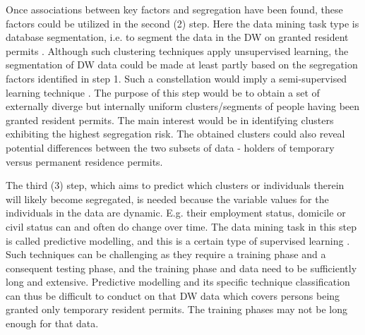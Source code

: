 Once associations between key factors and segregation have been found, 
these factors could be utilized in the second (2) step. 
Here the data mining task type is database segmentation, 
i.e. to segment the data in the DW on granted resident permits \cite[chapter~34.2]{CourseLitt}. 
Although such clustering techniques apply unsupervised learning, 
the segmentation of DW data could be made at least partly based on the segregation factors identified in step 1. 
Such a constellation would imply a semi-supervised learning technique \cite{l6video}. 
The purpose of this step would be to obtain a set of externally diverge but 
internally uniform clusters/segments of people having been granted resident permits. 
The main interest would be in identifying clusters exhibiting the highest segregation risk. 
The obtained clusters could also reveal potential differences between the two subsets of data - 
holders of temporary versus permanent residence permits.  

The third (3) step, which aims to predict which clusters or individuals therein will likely become segregated, 
is needed because the variable values for the individuals in the data are dynamic. 
E.g. their employment status, domicile or civil status can and often do change over time. 
The data mining task in this step is called predictive modelling, and this is a certain type of supervised learning \cite[chapter~34.2]{CourseLitt}. 
Such techniques can be challenging as they require a training phase and a consequent testing phase, 
and the training phase and data need to be sufficiently long and extensive. 
Predictive modelling and its specific technique classification can thus be difficult to conduct on that DW data which 
covers persons being granted only temporary resident permits. The training phases may not be long enough for that data.    